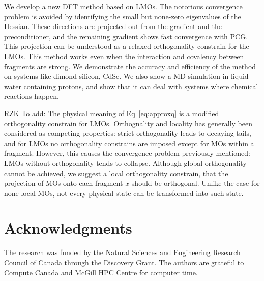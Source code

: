 \documentclass[aps,prl,twocolumn,reprint,amsmath,amssymb]{revtex4-1}
\begin{document}
\label{marker:conclusion} We develop a new DFT method based on LMOs. The notorious convergence problem is avoided by identifying the small but none-zero eigenvalues of the Hessian. These directions are projected out from the gradient and the preconditioner, and the remaining gradient shows fast convergence with PCG. This projection can be understood as a relaxed orthogonality constrain for the LMOs. This method works even when the interaction and covalency between fragments are strong. We demonstrate the accuracy and efficiency of the method on systems like dimond silicon, CdSe. We also show a MD simulation in liquid water containing protons, and show that it can deal with systems where chemical reactions happen.

RZK To add: The physical meaning of Eq~\ref{eq:approxq} is a modified orthogonality constrain for LMOs. Orthognality and locality has generally been considered as competing properties: strict orthogonality leads to decaying tails, and for LMOs no orthogonality constrains are imposed except for MOs within a fragment. However, this causes the convergence problem previously mentioned: LMOs without orthogonality tends to collapse. Although global orthogonality cannot be achieved, we suggest a local orthogonality constrain, that the projection of MOs onto each fragment $x$ should be orthogonal. Unlike the case for none-local MOs, not every physical state can be transformed into such state.

\section{Acknowledgments} The research was funded by the Natural Sciences and Engineering Research Council of Canada through the Discovery Grant. The authors are grateful to Compute Canada and McGill HPC Centre for computer time.


\end{document}

